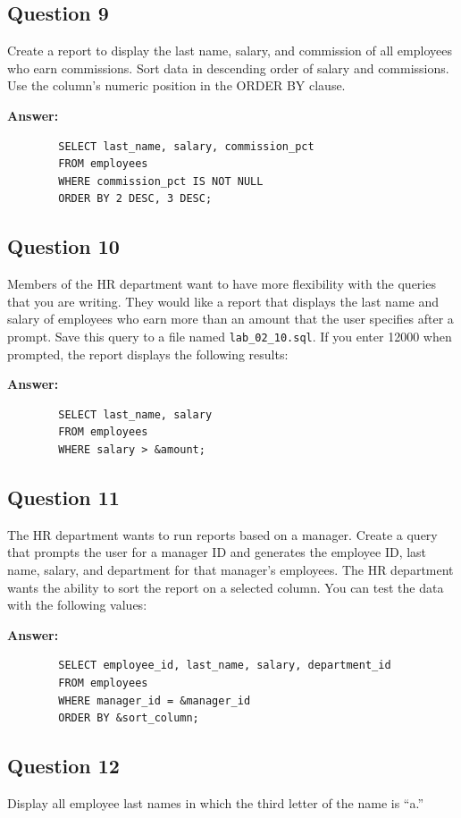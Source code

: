 \documentclass[12pt,a4paper]{article}
\begin{document}
\subsection*{Question 9}
Create a report to display the last name, salary, and commission of all employees who earn 
commissions. Sort data in descending order of salary and commissions.
Use the column’s numeric position in the ORDER BY clause.

\textbf{Answer:}
    \begin{lstlisting}
        SELECT last_name, salary, commission_pct
        FROM employees
        WHERE commission_pct IS NOT NULL
        ORDER BY 2 DESC, 3 DESC;
    \end{lstlisting}

\subsection*{Question 10}
Members of the HR department want to have more flexibility with the queries that you are 
writing. They would like a report that displays the last name and salary of employees who earn 
more than an amount that the user specifies after a prompt. Save this query to a file named 
\texttt{lab\_02\_10.sql}. If you enter 12000 when prompted, the report displays the following 
results:

\textbf{Answer:}
    \begin{lstlisting}
        SELECT last_name, salary
        FROM employees
        WHERE salary > &amount;
    \end{lstlisting}

\subsection*{Question 11}
The HR department wants to run reports based on a manager. Create a query that prompts the 
user for a manager ID and generates the employee ID, last name, salary, and department for 
that manager’s employees. The HR department wants the ability to sort the report on a selected 
column. You can test the data with the following values:

\textbf{Answer:}
    \begin{lstlisting}
        SELECT employee_id, last_name, salary, department_id
        FROM employees
        WHERE manager_id = &manager_id
        ORDER BY &sort_column;
    \end{lstlisting}

\subsection*{Question 12}
Display all employee last names in which the third letter of the name is “a.”
\end{document}
